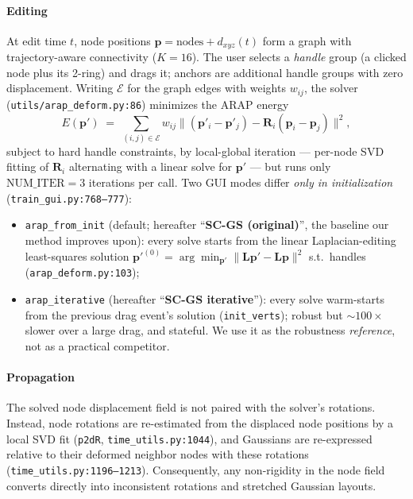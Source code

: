 \documentclass[10pt,twocolumn]{article}
\newcommand{\fromInit}{\texttt{arap\_from\_init}}
\newcommand{\iterMode}{\texttt{arap\_iterative}}
\newcommand{\scgsOrig}{SC-GS (original)}
\newcommand{\scgsIter}{SC-GS iterative}
\begin{document}
\paragraph{Editing}
At edit time $t$, node positions $\mathbf{p} = \mathrm{nodes} + d_{xyz}(t)$
form a graph with trajectory-aware connectivity ($K{=}16$). The user selects a
\emph{handle} group (a clicked node plus its 2-ring) and drags it; anchors are
additional handle groups with zero displacement. Writing $\mathcal{E}$ for the
graph edges with weights $w_{ij}$, the solver
(\texttt{utils/arap\_deform.py:86}) minimizes the ARAP energy
\begin{equation}
  E(\mathbf{p}') \;=\; \sum_{(i,j)\in\mathcal{E}} w_{ij}
  \bigl\lVert (\mathbf{p}'_i - \mathbf{p}'_j) -
  \mathbf{R}_i (\mathbf{p}_i - \mathbf{p}_j) \bigr\rVert^2 ,
  \label{eq:arap}
\end{equation}
subject to hard handle constraints, by local-global iteration --- per-node SVD
fitting of $\mathbf{R}_i$ alternating with a linear solve for $\mathbf{p}'$
--- but runs only $\mathrm{NUM\_ITER}=3$ iterations per call. Two GUI modes
differ \emph{only in initialization} (\texttt{train\_gui.py:768--777}):
\begin{itemize}\itemsep1pt
  \item \fromInit{} (default; hereafter ``\textbf{\scgsOrig{}}'', the baseline
        our method improves upon): every solve starts from the linear
        Laplacian-editing least-squares solution
        $\mathbf{p}'^{(0)} = \arg\min_{\mathbf{p}'}
        \lVert \mathbf{L}\mathbf{p}' - \mathbf{L}\mathbf{p} \rVert^2$
        s.t.\ handles (\texttt{arap\_deform.py:103});
  \item \iterMode{} (hereafter ``\textbf{\scgsIter{}}''): every solve
        warm-starts from the previous drag event's solution
        (\texttt{init\_verts}); robust but ${\sim}100\times$ slower over a
        large drag, and stateful. We use it as the robustness
        \emph{reference}, not as a practical competitor.
\end{itemize}

\paragraph{Propagation}
The solved node displacement field is not paired with the solver's rotations.
Instead, node rotations are re-estimated from the displaced node positions by a
local SVD fit (\texttt{p2dR}, \texttt{time\_utils.py:1044}), and Gaussians are
re-expressed relative to their deformed neighbor nodes with these rotations
(\texttt{time\_utils.py:1196--1213}). Consequently, any non-rigidity in the
node field converts directly into inconsistent rotations and stretched Gaussian
layouts.
\end{document}
